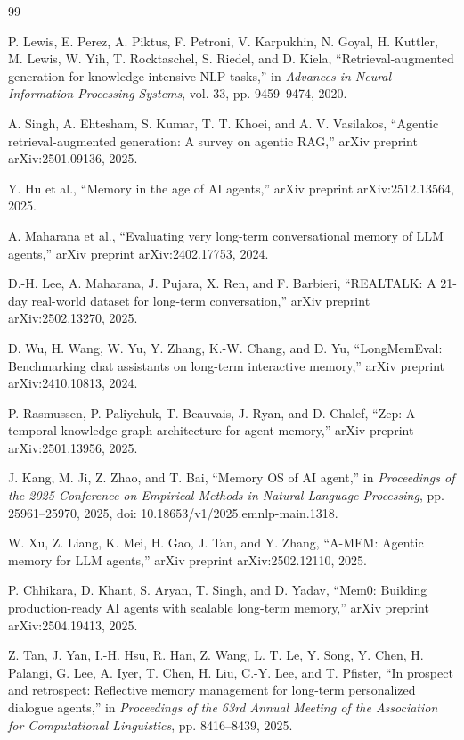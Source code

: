 \begin{thebibliography}{99}

\sloppy

P. Lewis, E. Perez, A. Piktus, F. Petroni, V. Karpukhin, N. Goyal, H. Kuttler, M. Lewis, W. Yih, T. Rocktaschel, S. Riedel, and D. Kiela, ``Retrieval-augmented generation for knowledge-intensive NLP tasks,'' in \emph{Advances in Neural Information Processing Systems}, vol. 33, pp. 9459--9474, 2020.

A. Singh, A. Ehtesham, S. Kumar, T. T. Khoei, and A. V. Vasilakos, ``Agentic retrieval-augmented generation: A survey on agentic RAG,'' arXiv preprint arXiv:2501.09136, 2025.

Y. Hu et al., ``Memory in the age of AI agents,'' arXiv preprint arXiv:2512.13564, 2025.

A. Maharana et al., ``Evaluating very long-term conversational memory of LLM agents,'' arXiv preprint arXiv:2402.17753, 2024.

D.-H. Lee, A. Maharana, J. Pujara, X. Ren, and F. Barbieri, ``REALTALK: A 21-day real-world dataset for long-term conversation,'' arXiv preprint arXiv:2502.13270, 2025.

D. Wu, H. Wang, W. Yu, Y. Zhang, K.-W. Chang, and D. Yu, ``LongMemEval: Benchmarking chat assistants on long-term interactive memory,'' arXiv preprint arXiv:2410.10813, 2024.

P. Rasmussen, P. Paliychuk, T. Beauvais, J. Ryan, and D. Chalef, ``Zep: A temporal knowledge graph architecture for agent memory,'' arXiv preprint arXiv:2501.13956, 2025.

J. Kang, M. Ji, Z. Zhao, and T. Bai, ``Memory OS of AI agent,'' in \emph{Proceedings of the 2025 Conference on Empirical Methods in Natural Language Processing}, pp. 25961--25970, 2025, doi: 10.18653/v1/2025.emnlp-main.1318.

W. Xu, Z. Liang, K. Mei, H. Gao, J. Tan, and Y. Zhang, ``A-MEM: Agentic memory for LLM agents,'' arXiv preprint arXiv:2502.12110, 2025.

P. Chhikara, D. Khant, S. Aryan, T. Singh, and D. Yadav, ``Mem0: Building production-ready AI agents with scalable long-term memory,'' arXiv preprint arXiv:2504.19413, 2025.

Z. Tan, J. Yan, I.-H. Hsu, R. Han, Z. Wang, L. T. Le, Y. Song, Y. Chen, H. Palangi, G. Lee, A. Iyer, T. Chen, H. Liu, C.-Y. Lee, and T. Pfister, ``In prospect and retrospect: Reflective memory management for long-term personalized dialogue agents,'' in \emph{Proceedings of the 63rd Annual Meeting of the Association for Computational Linguistics}, pp. 8416--8439, 2025.


\end{thebibliography}
